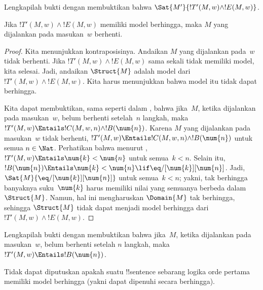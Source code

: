 \documentclass[../../../include/open-logic-section]{subfiles}
\begin{document}
\begin{prob}
  Lengkapilah bukti  dengan membuktikan
  bahwa $\Sat{M'}{!T'(M,w) \land !E(M,w)}$.
\end{prob}

\begin{lem}
  Jika $!T'(M,w) \land !E(M,w)$ memiliki model berhingga, maka $M$ yang
  dijalankan pada masukan~$w$ berhenti.
\end{lem}

\begin{proof}
  Kita menunjukkan kontraposisinya. Andaikan $M$ yang dijalankan pada~$w$
  tidak berhenti. Jika $!T'(M,w) \land !E(M,w)$ sama sekali tidak memiliki
  model, kita selesai. Jadi, andaikan $\Struct{M}$ adalah model dari
  $!T'(M,w) \land !E(M,w)$. Kita harus menunjukkan bahwa model itu tidak dapat
  berhingga.

  Kita dapat membuktikan, sama seperti dalam , bahwa
  jika~$M$, ketika dijalankan pada masukan~$w$, belum berhenti setelah~$n$
  langkah, maka
  $!T'(M,w) \Entails !C(M, w, n) \land !B(\num{n})$. Karena $M$ yang
  dijalankan pada masukan~$w$ tidak berhenti,
  $!T'(M,w) \Entails !C(M, w, n) \land !B(\num{n})$ untuk semua
  $n \in \Nat$. Perhatikan bahwa menurut ,
  $!T'(M,w) \Entails \num{k} < \num{n}$ untuk semua~$k < n$. Selain itu,
  $!B(\num{n}) \Entails \num{k} < \num{n} \lif
  \eq/[\num{k}][\num{n}]$. Jadi,
  $\Sat{M}{\eq/[\num{k}][\num{n}]}$ untuk semua~$k < n$; yakni, tak berhingga
  banyaknya suku~$\num{k}$ harus memiliki nilai yang semuanya berbeda dalam
  $\Struct{M}$. Namun, hal ini mengharuskan $\Domain{M}$ tak berhingga, sehingga
  $\Struct{M}$ tidak dapat menjadi model berhingga dari
  $!T'(M,w) \land !E(M,w)$.
\end{proof}

\begin{prob}
  Lengkapilah bukti  dengan membuktikan
  bahwa jika~$M$, ketika dijalankan pada masukan~$w$, belum berhenti setelah
  $n$ langkah, maka $!T'(M,w) \Entails !B(\num{n})$.
\end{prob}

\begin{thm}
  Tidak dapat diputuskan apakah suatu !!{sentence} sebarang logika orde
  pertama memiliki model berhingga (yakni dapat dipenuhi secara berhingga).
\end{thm}
\end{document}
